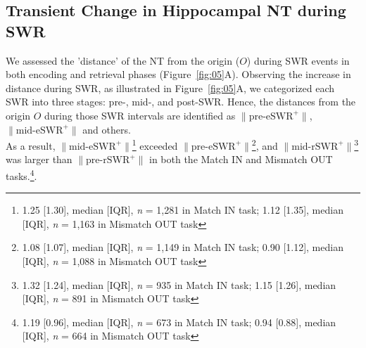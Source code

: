 \documentclass[preprint,review,12pt]{elsarticle}%
\begin{document}
\subsection{Transient Change in Hippocampal NT during SWR}
We assessed the 'distance' of the NT from the origin ($O$) during SWR events in both encoding and retrieval phases (Figure~\ref{fig:05}A). Observing the increase in distance during SWR, as illustrated in Figure~\ref{fig:05}A, we categorized each SWR into three stages: pre-, mid-, and post-SWR. Hence, the distances from the origin $O$ during those SWR intervals are identified as $\mathrm{\lVert \text{pre-eSWR}^+ \rVert}$, $\mathrm{\lVert \text{mid-eSWR}^+ \rVert}$ and others.
\\
\indent
As a result, $\mathrm{\lVert \text{mid-eSWR}^+ \rVert}$\footnote{1.25 [1.30], median [IQR], \textit{n} = 1,281 in Match IN task; 1.12 [1.35], median [IQR], \textit{n} = 1,163 in Mismatch OUT task} exceeded $\mathrm{\lVert \text{pre-eSWR}^+ \rVert}$\footnote{1.08 [1.07], median [IQR], \textit{n} = 1,149 in Match IN task; 0.90 [1.12], median [IQR], \textit{n} = 1,088 in Mismatch OUT task}, and $\mathrm{\lVert \text{mid-rSWR}^+ \rVert}$\footnote{1.32 [1.24], median [IQR], \textit{n} = 935 in Match IN task; 1.15 [1.26], median [IQR], \textit{n} = 891 in Mismatch OUT task} was larger than $\mathrm{\lVert \text{pre-rSWR}^+ \rVert}$ in both the Match IN and Mismatch OUT tasks.\footnote{1.19 [0.96], median [IQR], \textit{n} = 673 in Match IN task; 0.94 [0.88], median [IQR], \textit{n} = 664 in Mismatch OUT task}.
\end{document}
